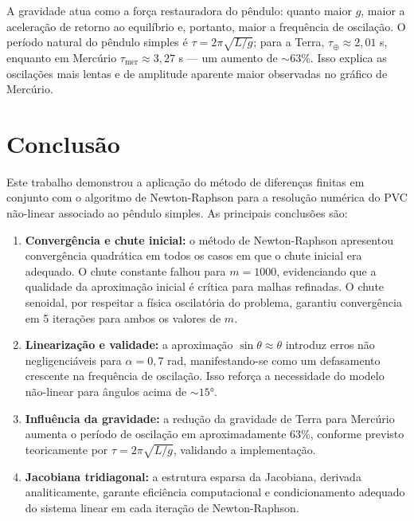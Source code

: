 \documentclass[
  12pt,
  a4paper,
  chapter=TITLE,
  section=TITLE,
  brazil,
  oneside
]{abntex2}
\begin{document}
A gravidade atua como a força restauradora do pêndulo: quanto maior $g$, maior
a aceleração de retorno ao equilíbrio e, portanto, maior a frequência de oscilação.
O período natural do pêndulo simples é $\tau = 2\pi\sqrt{L/g}$; para a Terra,
$\tau_\oplus \approx 2{,}01$ s, enquanto em Mercúrio $\tau_\text{mer} \approx 3{,}27$ s ---
um aumento de $\sim 63\%$. Isso explica as oscilações mais lentas e de amplitude
aparente maior observadas no gráfico de Mercúrio.

\chapter{Conclusão}

Este trabalho demonstrou a aplicação do método de diferenças finitas em conjunto com
o algoritmo de Newton-Raphson para a resolução numérica do PVC não-linear associado
ao pêndulo simples. As principais conclusões são:

\begin{enumerate}
  \item \textbf{Convergência e chute inicial:} o método de Newton-Raphson apresentou
        convergência quadrática em todos os casos em que o chute inicial era adequado.
        O chute constante falhou para $m = 1000$, evidenciando que a qualidade da
        aproximação inicial é crítica para malhas refinadas. O chute senoidal, por
        respeitar a física oscilatória do problema, garantiu convergência em 5
        iterações para ambos os valores de $m$.

  \item \textbf{Linearização e validade:} a aproximação $\sin\theta \approx \theta$
        introduz erros não negligenciáveis para $\alpha = 0{,}7$ rad, manifestando-se
        como um defasamento crescente na frequência de oscilação. Isso reforça a
        necessidade do modelo não-linear para ângulos acima de $\sim 15°$.

  \item \textbf{Influência da gravidade:} a redução da gravidade de Terra para
        Mercúrio aumenta o período de oscilação em aproximadamente $63\%$, conforme
        previsto teoricamente por $\tau = 2\pi\sqrt{L/g}$, validando a implementação.

  \item \textbf{Jacobiana tridiagonal:} a estrutura esparsa da Jacobiana, derivada
        analiticamente, garante eficiência computacional e condicionamento adequado
        do sistema linear em cada iteração de Newton-Raphson.
\end{enumerate}
\end{document}
